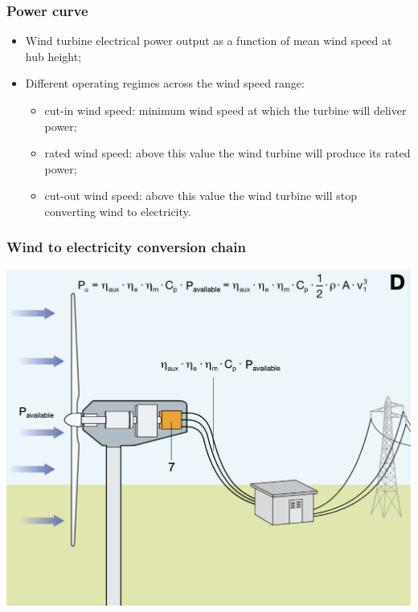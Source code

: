 \documentclass{article}
\begin{document}
\subsubsection{Power curve}
\begin{itemize}
    \item Wind turbine electrical power output as a function of mean wind speed at hub height;
    \item Different operating regimes across the wind speed range:
    \begin{itemize}[label=$\circ$]
        \item cut-in wind speed: minimum wind speed at which the turbine will deliver power;
        \item rated wind speed: above this value the wind turbine will produce its rated power;
        \item cut-out wind speed: above this value the wind turbine will stop converting wind to electricity.
    \end{itemize}
\end{itemize}
\wrapfill

\subsubsection{Wind to electricity conversion chain}
\begin{center}
    \includegraphics[width=.7\textwidth]{media/conversion_chain.png}
\end{center}
\end{document}
